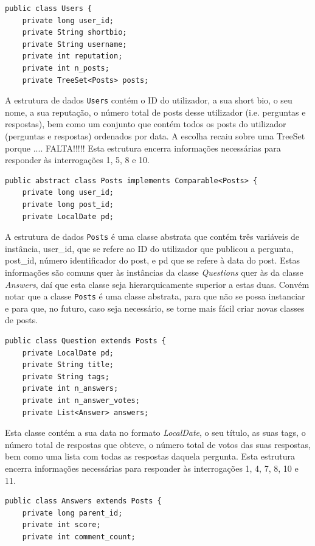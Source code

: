 \documentclass[a4paper]{article}
\begin{document}
\begin{verbatim}
public class Users {
    private long user_id;
    private String shortbio;
    private String username;
    private int reputation;
    private int n_posts;
    private TreeSet<Posts> posts;
\end{verbatim}

A estrutura de dados \texttt{Users} contém o ID do utilizador, a sua short bio, o seu nome,
a sua reputação, o número total de posts desse utilizador (i.e. perguntas e respostas),
bem como um conjunto que contém todos os posts do utilizador (perguntas e respostas)
ordenados por data. A escolha recaiu sobre uma TreeSet porque .... FALTA!!!!!
Esta estrutura encerra informações necessárias para responder às interrogações 1,
5, 8 e 10.

\begin{verbatim}
public abstract class Posts implements Comparable<Posts> {
    private long user_id;
    private long post_id;
    private LocalDate pd;
\end{verbatim}

A estrutura de dados \texttt{Posts} é uma classe abstrata que contém três variáveis
de instância, user\_id, que se refere ao ID do utilizador que publicou a pergunta,
post\_id, número identificador do post, e pd que se refere à data do post.
Estas informações são comuns quer às instâncias da classe
\textit{Questions} quer às da classe \textit{Answers}, daí que esta classe seja
hierarquicamente superior a estas duas. Convém notar que a classe \texttt{Posts} é uma
classe abstrata, para que não se possa instanciar e para que, no futuro,
caso seja necessário, se torne mais fácil criar novas classes de posts.



\begin{verbatim}
public class Question extends Posts {
    private LocalDate pd;
    private String title;
    private String tags;
    private int n_answers;
    private int n_answer_votes;
    private List<Answer> answers;
\end{verbatim}


Esta classe contém a sua data no formato \textit{LocalDate}, o seu título,
as suas tags, o número total de respostas que obteve, o número total de votos
das suas respostas, bem como uma lista com todas as respostas daquela pergunta.
Esta estrutura encerra informações necessárias para responder às interrogações 1,
4, 7, 8, 10 e 11.


\begin{verbatim}
public class Answers extends Posts {
    private long parent_id;
    private int score;
    private int comment_count;
\end{verbatim}
\end{document}
